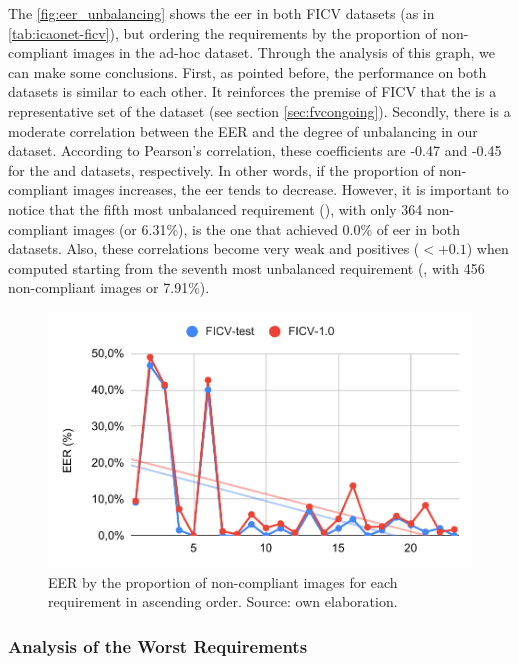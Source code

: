 The \autoref{fig:eer_unbalancing} shows the \acs{eer} in both FICV datasets (as in \autoref{tab:icaonet-ficv}), but ordering the requirements by the proportion of non-compliant images in the ad-hoc dataset. Through the analysis of this graph, we can make some conclusions. First, as pointed before, the performance on both datasets is similar to each other. It reinforces the premise of FICV that the \ficvtest is a representative set of the \ficvofficial dataset (see section \ref{sec:fvcongoing}). Secondly, there is a moderate correlation between the EER and the degree of unbalancing in our dataset. According to Pearson's correlation, these coefficients are -0.47 and -0.45 for the \ficvtest and \ficvofficial datasets, respectively. In other words, if the proportion of non-compliant images increases, the \acs{eer} tends to decrease. However, it is important to notice that the fifth most unbalanced requirement (\veiloverface), with only 364 non-compliant images (or 6.31\%), is the one that achieved 0.0\% of \acs{eer} in both datasets. Also, these correlations become very weak and positives ($< +0.1$) when computed starting from the seventh most unbalanced requirement (\toodarklight, with 456 non-compliant images or 7.91\%).

\begin{figure}[ht]
\centering
\includegraphics[width=0.8\linewidth]{images/graphs/eer_unbalancing.pdf}
\caption{EER by the proportion of non-compliant images for each requirement in ascending order. Source: own elaboration.}
\label{fig:eer_unbalancing}
\end{figure}



\subsubsection{Analysis of the Worst Requirements}

